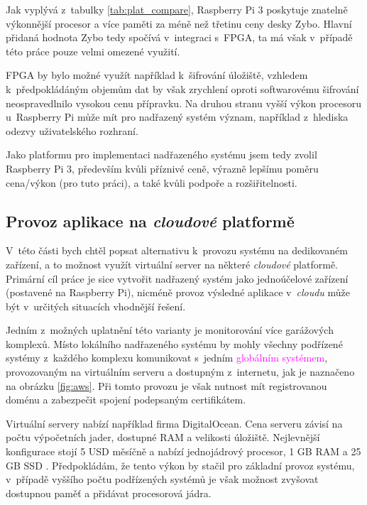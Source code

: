 Jak vyplývá z~tabulky \ref{tab:plat_compare}, Raspberry Pi 3 poskytuje znatelně výkonnější procesor a více paměti za méně než třetinu ceny desky Zybo. Hlavní přidaná hodnota Zybo tedy spočívá v~integraci s~FPGA, ta má však v~případě této práce pouze velmi omezené využití. 

FPGA by bylo možné využít například k~šifrování úložiště, vzhledem k~předpokládáným objemům dat by však zrychlení oproti softwarovému šifrování neospravedlnilo vysokou cenu přípravku. Na druhou stranu vyšší výkon procesoru u~Raspberry Pi může mít pro nadřazený systém význam, například z~hlediska odezvy uživatelského rozhraní.

Jako platformu pro implementaci nadřazeného systému jsem tedy zvolil Raspberry Pi 3, především kvůli příznivé ceně, výrazně lepšímu poměru cena/výkon (pro tuto práci), a také kvůli podpoře a rozšiřitelnosti.

\subsection{Provoz aplikace na \textit{cloudové} platformě}
\label{sec:an_cloud}

V~této části bych chtěl popsat alternativu k~provozu systému na dedikovaném zařízení, a to možnost využít virtuální server na některé \textit{cloudové} platformě. Primární cíl práce je sice vytvořit nadřazený systém jako jednoúčelové zařízení (postavené na Raspberry Pi), nicméně provoz výsledné aplikace v~\textit{cloudu} může být v~určitých situacích vhodnější řešení.

Jedním z~možných uplatnění této varianty je monitorování více garážových komplexů. Místo lokálního nadřazeného systému by mohly všechny \textcolor{blue2}{podřízené systémy} z~každého komplexu komunikovat s~jedním \textcolor{magenta}{globálním systémem}, provozovaným na virtuálním serveru a dostupným z~internetu, jak je naznačeno na obrázku \ref{fig:aws}. Při tomto provozu je však nutnost mít registrovanou doménu a zabezpečit spojení podepsaným certifikátem.

Virtuální servery nabízí například firma DigitalOcean. Cena serveru závisí na počtu výpočetních jader, dostupné RAM a velikosti úložiště. Nejlevnější konfigurace stojí 5 USD měsíčně a nabízí jednojádrový procesor, 1 GB RAM a 25 GB SSD \cite{digi_pricing}. Předpokládám, že tento výkon by stačil pro základní provoz systému, v~případě vyššího počtu podřízených systémů je však možnost zvyšovat dostupnou paměť a přidávat procesorová jádra. 

